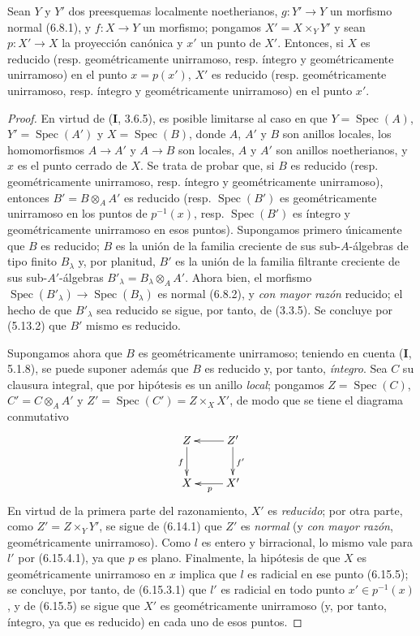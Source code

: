 \begin{proposition}[6.15.10]
\label{IV.2.s6.15.10-fr}
Sean $Y$ y $Y'$ dos preesquemas localmente noetherianos,
$g:Y'\to Y$ un morfismo normal \textup{(6.8.1)}, y $f:X\to Y$ un
morfismo; pongamos $X'=X\times_Y Y'$ y sean $p:X'\to X$
la proyección canónica y $x'$ un punto de $X'$. Entonces,
si $X$ es reducido \textup{(resp.} geométricamente unirramoso,
\textup{resp.} íntegro y geométricamente unirramoso\textup{)} en el punto
$x=p(x')$, $X'$ es reducido \textup{(resp.} geométricamente
unirramoso, \textup{resp.} íntegro y geométricamente unirramoso\textup{)}
en el punto $x'$.
\end{proposition}

\begin{proof}
En virtud de (\textbf I, 3.6.5), es posible limitarse al caso en que
$Y=\operatorname{Spec}(A)$, $Y'=\operatorname{Spec}(A')$ y
$X=\operatorname{Spec}(B)$, donde $A$, $A'$ y $B$ son anillos
locales, los homomorfismos $A\to A'$ y $A\to B$ son locales,
$A$ y $A'$ son anillos noetherianos, y $x$ es el punto cerrado
de $X$. Se trata de probar que, si $B$ es reducido (resp.
geométricamente unirramoso, resp. íntegro y geométricamente
unirramoso), entonces $B'=B\otimes_A A'$ es reducido (resp.
$\operatorname{Spec}(B')$ es geométricamente unirramoso en
los puntos de $p^{-1}(x)$, resp. $\operatorname{Spec}(B')$
es íntegro y geométricamente unirramoso en esos puntos).
Supongamos primero únicamente que $B$ es reducido; $B$ es
la unión de la familia creciente de sus sub-$A$-álgebras
de tipo finito $B_\lambda$ y, por planitud, $B'$ es la unión
de la familia filtrante creciente de sus sub-$A'$-álgebras
$B'_\lambda=B_\lambda\otimes_A A'$. Ahora bien, el morfismo
$\operatorname{Spec}(B'_\lambda)\to\operatorname{Spec}(B_\lambda)$
es normal (6.8.2), y \emph{con mayor razón} reducido; el hecho de
que $B'_\lambda$ sea reducido se sigue, por tanto, de (3.3.5).
Se concluye por (5.13.2) que $B'$ mismo es reducido.

Supongamos ahora que $B$ es geométricamente unirramoso;
teniendo en cuenta (\textbf{I}, 5.1.8), se puede suponer además que
$B$ es reducido y, por tanto, \emph{íntegro}. Sea $C$ su clausura
integral, que por hipótesis es un anillo \emph{local}; pongamos
$Z=\operatorname{Spec}(C)$, $C'=C\otimes_A A'$ y
$Z'=\operatorname{Spec}(C')=Z\times_X X'$, de modo que se
tiene el diagrama conmutativo
\[
\xymatrix{
Z \ar[d]_f & Z' \ar[l] \ar[d]^{f'}\\
X & X' \ar[l]^p
}
\]
En virtud de la primera parte del razonamiento, $X'$ es
\emph{reducido}; por otra parte, como $Z'=Z\times_Y Y'$, se sigue
de (6.14.1) que $Z'$ es \emph{normal} (y \emph{con mayor razón},
geométricamente unirramoso). Como $l$ es entero y
birracional, lo mismo vale para $l'$ por (6.15.4.1), ya
que $p$ es plano. Finalmente, la hipótesis de que $X$ es
geométricamente unirramoso en $x$ implica que $l$ es
radicial en ese punto (6.15.5); se concluye, por tanto, de
(6.15.3.1) que $l'$ es radicial en todo punto
$x'\in p^{-1}(x)$, y de (6.15.5) se sigue que $X'$ es
geométricamente unirramoso (y, por tanto, íntegro, ya que
es reducido) en cada uno de esos puntos.
\end{proof}
